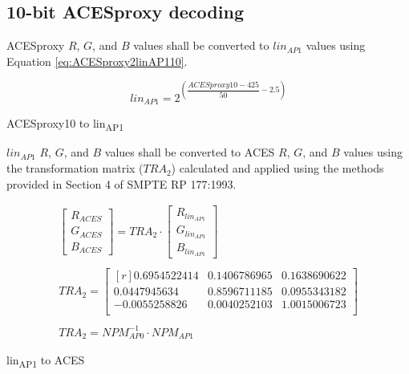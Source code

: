 \subsection{10-bit ACESproxy decoding}
ACESproxy $R$, $G$, and $B$ values shall be converted to $lin_{AP1}$ values using Equation \ref{eq:ACESproxy2linAP110}.

\begin{floatequ} 
\begin{equation} 
    lin_{AP1} = 2^{\left(\dfrac{ACESproxy10-425}{50}-2.5\right)}
\end{equation}
\caption{ACESproxy10 to lin\textsubscript{AP1}}
\label{eq:ACESproxy2linAP110}
\end{floatequ}

$lin_{AP1}$ $R$, $G$, and $B$ values shall be converted to ACES $R$, $G$, and $B$ values using the transformation matrix ($TRA_{2}$) calculated and applied using the methods provided in Section 4 of SMPTE RP 177:1993.


\begin{floatequ} 
\begin{gather}
    \begin{bmatrix}
        R_{ACES}\\
        G_{ACES}\\
        B_{ACES}
    \end{bmatrix}
    =
    TRA_{2}
    \cdot
    \begin{bmatrix}
        R_{lin_{AP1}}\\
        G_{lin_{AP1}}\\
        B_{lin_{AP1}}
    \end{bmatrix} \\
    \\
    TRA_{2} =
    \begin{bmatrix*}[r]
        0.6954522414 & 0.1406786965 & 0.1638690622 \\
        0.0447945634 & 0.8596711185 & 0.0955343182 \\
        -0.0055258826 & 0.0040252103 & 1.0015006723 \\
    \end{bmatrix*} \\
    \\
    TRA_{2} = NPM^{-1}_{AP0} \cdot NPM_{AP1}
\end{gather}
\caption{lin\textsubscript{AP1} to ACES}
\label{eq:linAP12ACES10}
\end{floatequ}


